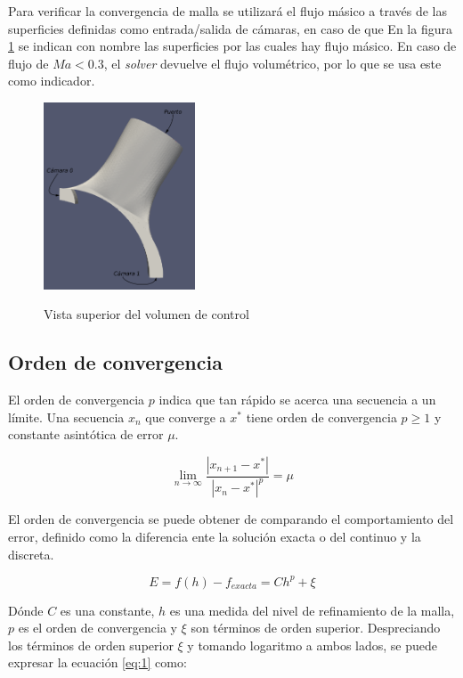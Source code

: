 \documentclass[11pt]{article}
\begin{document}
Para verificar la convergencia de malla se utilizará el flujo másico a través
de las superficies definidas como entrada/salida de cámaras, en caso de que
%
En la figura \ref{fig:parches} se indican con nombre las superficies por las
cuales hay flujo másico.
%
En caso de flujo de $Ma < 0.3$, el \emph{solver} devuelve el flujo volumétrico,
por lo que se usa este como indicador.
\begin{figure}
    \centering
    \includegraphics[width=0.4\textwidth]{nombres-parches.png}
    \label{fig:parches}
    \caption{Vista superior del volumen de control}
\end{figure}

\subsection{Orden de convergencia}
%
El orden de convergencia $p$ indica que tan rápido se acerca una secuencia a un
límite.
%
Una secuencia ${x_n}$ que converge a $x^*$ tiene orden de convergencia $p \ge
1$ y constante asintótica de error $\mu$.

\begin{equation}
    \lim_{n\rightarrow \infty} \frac{|x_{n+1} - x^*|} {|x_{n} - x^*|^p} = \mu
\end{equation}

El orden de convergencia se puede obtener de comparando el comportamiento del
error, definido como la diferencia ente la solución exacta o del continuo y la
discreta.

\begin{equation}
    E = f(h) - f_{exacta} = Ch^p + \xi
    \label{eq:1}
\end{equation}

Dónde $C$ es una constante, $h$ es una medida del nivel de refinamiento de la
malla, $p$ es el orden de convergencia y $\xi$ son términos de orden superior.
%
Despreciando los términos de orden superior $\xi$ y tomando logaritmo a ambos
lados, se puede expresar la ecuación \ref{eq:1} como:
\end{document}
